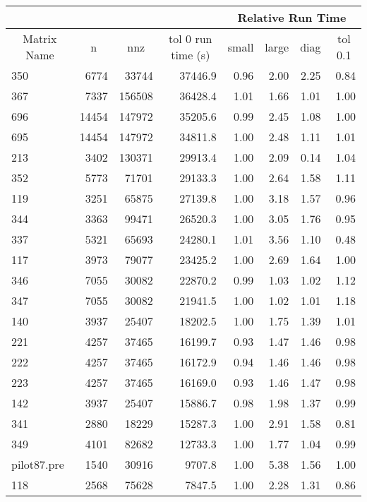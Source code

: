 \documentclass[10pt]{article}
\begin{document}
\begin{longtable}{|l|r|r|r|r|r|r|r|}
\hline	
& & & & \multicolumn{4}{c|}{Relative Run Time}  \\ \hline
\multicolumn{1}{|c|}{Matrix Name}	& \multicolumn{1}{c|}{n} & \multicolumn{1}{c|}{nnz} & \multicolumn{1}{c|}{tol 0 run time (s)} & \multicolumn{1}{c|}{small} & \multicolumn{1}{c|}{large} & \multicolumn{1}{c|}{diag} & \multicolumn{1}{c|}{tol 0.1} \\  \hline \endhead
350	&	6774	&	33744	&	37446.9	&	0.96	&	2.00	&	2.25	&	0.84	\\
367	&	7337	&	156508	&	36428.4	&	1.01	&	1.66	&	1.01	&	1.00	\\
696	&	14454	&	147972	&	35205.6	&	0.99	&	2.45	&	1.08	&	1.00	\\
695	&	14454	&	147972	&	34811.8	&	1.00	&	2.48	&	1.11	&	1.01	\\
213	&	3402	&	130371	&	29913.4	&	1.00	&	2.09	&	0.14	&	1.04	\\
352	&	5773	&	71701	&	29133.3	&	1.00	&	2.64	&	1.58	&	1.11	\\
119	&	3251	&	65875	&	27139.8	&	1.00	&	3.18	&	1.57	&	0.96	\\
344	&	3363	&	99471	&	26520.3	&	1.00	&	3.05	&	1.76	&	0.95	\\
337	&	5321	&	65693	&	24280.1	&	1.01	&	3.56	&	1.10	&	0.48	\\
117	&	3973	&	79077	&	23425.2	&	1.00	&	2.69	&	1.64	&	1.00	\\
346	&	7055	&	30082	&	22870.2	&	0.99	&	1.03	&	1.02	&	1.12	\\
347	&	7055	&	30082	&	21941.5	&	1.00	&	1.02	&	1.01	&	1.18	\\
140	&	3937	&	25407	&	18202.5	&	1.00	&	1.75	&	1.39	&	1.01	\\
221	&	4257	&	37465	&	16199.7	&	0.93	&	1.47	&	1.46	&	0.98	\\
222	&	4257	&	37465	&	16172.9	&	0.94	&	1.46	&	1.46	&	0.98	\\
223	&	4257	&	37465	&	16169.0	&	0.93	&	1.46	&	1.47	&	0.98	\\
142	&	3937	&	25407	&	15886.7	&	0.98	&	1.98	&	1.37	&	0.99	\\
341	&	2880	&	18229	&	15287.3	&	1.00	&	2.91	&	1.58	&	0.81	\\
349	&	4101	&	82682	&	12733.3	&	1.00	&	1.77	&	1.04	&	0.99	\\
pilot87.pre	&	1540	&	30916	&	9707.8	&	1.00	&	5.38	&	1.56	&	1.00	\\
118	&	2568	&	75628	&	7847.5	&	1.00	&	2.28	&	1.31	&	0.86	\\

\end{longtable}
\end{document}
